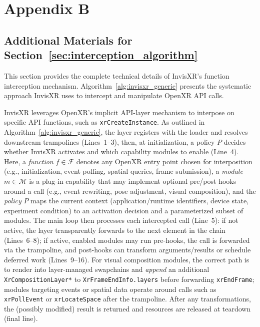 \documentclass[letterpaper,twocolumn,10pt]{article}
\begin{document}
{\footnotesize 
}

%
%
%
\section{Appendix B}
\subsection{Additional Materials for Section~\ref{sec:interception_algorithm}}
\label{sec:interception_algorithmAp}

This section provides the complete technical details of InvisXR's function interception mechanism. Algorithm~\ref{alg:invisxr_generic} presents the systematic approach InvisXR uses to intercept and manipulate OpenXR API calls.

InvisXR leverages OpenXR's implicit API-layer mechanism to interpose on specific API functions, such as \texttt{xrCreateInstance}. As outlined in Algorithm~\ref{alg:invisxr_generic}, the layer registers with the loader and resolves downstream trampolines (Lines~1–3), then, at initialization, a policy $P$ decides whether InvisXR activates and which capability modules to enable (Line~4). Here, a \emph{function} $f\!\in\!\mathcal{F}$ denotes any OpenXR entry point chosen for interposition (e.g., initialization, event polling, spatial queries, frame submission), a \emph{module} $m\!\in\!\mathcal{M}$ is a plug-in capability that may implement optional \textsf{pre}/\textsf{post} hooks around a call (e.g., event rewriting, pose adjustment, visual composition), and the \emph{policy} $P$ maps the current context (application/runtime identifiers, device state, experiment condition) to an activation decision and a parameterized subset of modules. The main loop then processes each intercepted call (Line~5): if not active, the layer transparently forwards to the next element in the chain (Lines~6–8); if active, enabled modules may run pre-hooks, the call is forwarded via the trampoline, and post-hooks can transform arguments/results or schedule deferred work (Lines~9–16). For visual composition modules, the correct path is to render into layer-managed swapchains and \emph{append} an additional \texttt{XrCompositionLayer*} to \texttt{XrFrameEndInfo.layers} before forwarding \texttt{xrEndFrame}; modules targeting events or spatial data operate around calls such as \texttt{xrPollEvent} or \texttt{xrLocateSpace} after the trampoline. After any transformations, the (possibly modified) result is returned and resources are released at teardown (final line).
\end{document}
